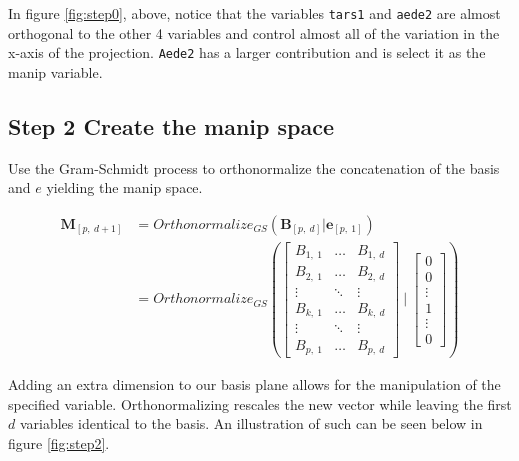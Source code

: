 \documentclass{monashthesis}
\begin{document}
In figure \ref{fig:step0}, above, notice that the variables
\texttt{tars1} and \texttt{aede2} are almost orthogonal to the other 4
variables and control almost all of the variation in the x-axis of the
projection. \texttt{Aede2} has a larger contribution and is select it as
the manip variable.

\subsection{Step 2 Create the manip
space}\label{step-2-create-the-manip-space}

Use the Gram-Schmidt process to orthonormalize the concatenation of the
basis and \(e\) yielding the manip space.

\begin{align*}
  \textbf{M}_{[p,~d+1]}
  &= Orthonormalize_{GS}( \textbf{B}_{[p,~d]}|\textbf{e}_{[p,~1]} ) \\
  &= Orthonormalize_{GS}
  \left(
    \begin{bmatrix}
      B_{1,~1} & \dots  & B_{1,~d} \\
      B_{2,~1} & \dots  & B_{2,~d} \\
      \vdots   & \ddots & \vdots   \\
      B_{k,~1} & \dots  & B_{k,~d} \\
      \vdots   & \ddots & \vdots   \\
      B_{p,~1} & \dots  & B_{p,~d}
    \end{bmatrix}
  ~|~
    \begin{bmatrix}
      0 \\
      0 \\
      \vdots \\
      1 \\
      \vdots \\
      0
    \end{bmatrix}
  \right)
\end{align*}

Adding an extra dimension to our basis plane allows for the manipulation
of the specified variable. Orthonormalizing rescales the new vector
while leaving the first \(d\) variables identical to the basis. An
illustration of such can be seen below in figure \ref{fig:step2}.
\end{document}

